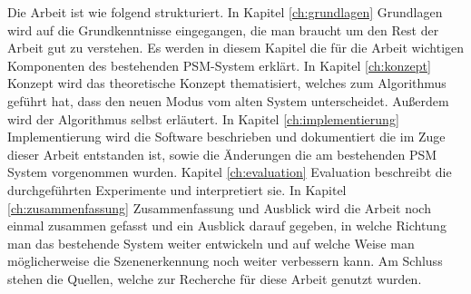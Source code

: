 Die Arbeit ist wie folgend strukturiert. In Kapitel \ref{ch:grundlagen} Grundlagen wird auf die Grundkenntnisse eingegangen, die man braucht um den Rest der Arbeit gut zu verstehen. Es werden in diesem Kapitel die für die Arbeit wichtigen Komponenten des bestehenden PSM-System erklärt. In Kapitel \ref{ch:konzept} Konzept wird das theoretische Konzept thematisiert, welches zum Algorithmus geführt hat, dass den neuen Modus vom alten System unterscheidet. Außerdem wird der Algorithmus selbst erläutert. In Kapitel \ref{ch:implementierung} Implementierung wird die Software beschrieben und dokumentiert die im Zuge dieser Arbeit entstanden ist, sowie die Änderungen die am bestehenden PSM System vorgenommen wurden. Kapitel \ref{ch:evaluation} Evaluation beschreibt die durchgeführten Experimente und interpretiert sie. In Kapitel \ref{ch:zusammenfassung} Zusammenfassung und Ausblick wird die Arbeit noch einmal zusammen gefasst und ein Ausblick darauf gegeben, in welche Richtung man das bestehende System weiter entwickeln und auf welche Weise man möglicherweise die Szenenerkennung noch weiter verbessern kann. Am Schluss stehen die Quellen, welche zur Recherche für diese Arbeit genutzt wurden.

